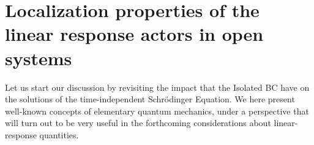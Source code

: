 \documentclass[reprint,aps,prb]{revtex4-1}
\begin{document}
% 


\section{Localization properties of the linear response actors in open systems}

Let us start our discussion by revisiting the impact that the Isolated BC have on the 
solutions of the time-independent Schr\"odinger Equation.
We here present well-known concepts of elementary quantum mechanics, under a perspective that
will turn out to be very useful in the forthcoming considerations about linear-response quantities.
\end{document}
